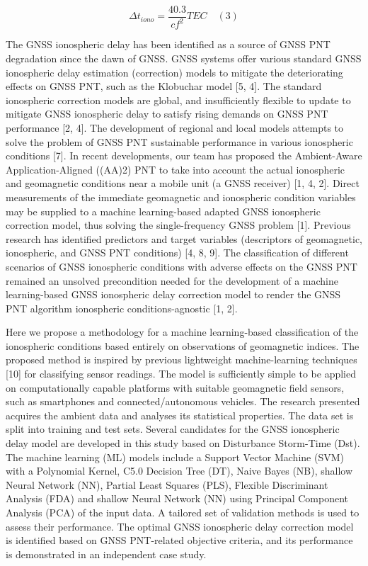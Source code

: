 \documentclass[sn-mathphys-num]{sn-jnl}%
\begin{document}
\begin{equation}
	\Delta t_{iono} = \frac{40.3}{c f^{2}} TEC
	\quad\left(3\right)
\end{equation}

The GNSS ionospheric delay has been identified as a source of GNSS PNT degradation since the dawn of GNSS. GNSS systems offer various standard GNSS ionospheric delay estimation (correction) models to mitigate the deteriorating effects on GNSS PNT, such as the Klobuchar model [5, 4]. The standard ionospheric correction models are global, and insufficiently flexible to update to mitigate GNSS ionospheric delay to satisfy rising demands on GNSS PNT performance [2, 4]. The development of regional and local models attempts to solve the problem of GNSS PNT sustainable performance in various ionospheric conditions [7]. In recent developments, our team has proposed the Ambient-Aware Application-Aligned ((AA)2) PNT to take into account the actual ionospheric and geomagnetic conditions near a mobile unit (a GNSS receiver) [1, 4, 2]. Direct measurements of the immediate geomagnetic and ionospheric condition variables may be supplied to a machine learning-based adapted GNSS ionospheric correction model, thus solving the single-frequency GNSS problem [1]. Previous research has identified predictors and target variables (descriptors of geomagnetic, ionospheric, and GNSS PNT conditions) [4, 8, 9]. The classification of different scenarios of GNSS ionospheric conditions with adverse effects on the GNSS PNT remained an unsolved precondition needed for the development of a machine learning-based GNSS ionospheric delay correction model to render the GNSS PNT algorithm ionospheric conditions-agnostic [1, 2].

Here we propose a methodology for a machine learning-based classification of the ionospheric conditions based entirely on observations of geomagnetic indices. The proposed method is inspired by previous lightweight machine-learning techniques [10] for classifying sensor readings. The model is sufficiently simple to be applied on computationally capable platforms with suitable geomagnetic field sensors, such as smartphones and connected/autonomous vehicles. The research presented acquires the ambient data and analyses its statistical properties. The data set is split into training and test sets. Several candidates for the GNSS ionospheric delay model are developed in this study based on Disturbance Storm-Time (Dst). The machine learning (ML) models include a Support Vector Machine (SVM) with a Polynomial Kernel, C5.0 Decision Tree (DT), Naive Bayes (NB), shallow Neural Network (NN), Partial Least Squares (PLS), Flexible Discriminant Analysis (FDA) and shallow Neural Network (NN) using Principal Component Analysis (PCA) of the input data. A tailored set of validation methods is used to assess their performance. The optimal GNSS ionospheric delay correction model is identified based on GNSS PNT-related objective criteria, and its performance is demonstrated in an independent case study.
\end{document}
